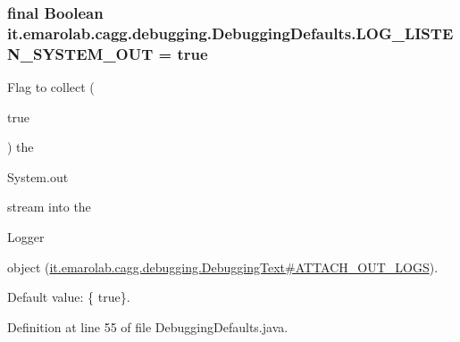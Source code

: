 \hypertarget{classit_1_1emarolab_1_1cagg_1_1debugging_1_1DebuggingDefaults_a2d4710f38eb7e92c5b733f49baefd243}{
\subsubsection[{L\-O\-G\-\_\-\-L\-I\-S\-T\-E\-N\-\_\-\-S\-Y\-S\-T\-E\-M\-\_\-\-O\-U\-T}]{\setlength{\rightskip}{0pt plus 5cm}final Boolean it.\-emarolab.\-cagg.\-debugging.\-Debugging\-Defaults.\-L\-O\-G\-\_\-\-L\-I\-S\-T\-E\-N\-\_\-\-S\-Y\-S\-T\-E\-M\-\_\-\-O\-U\-T = true\hspace{0.3cm}{\ttfamily [static]}}}\label{classit_1_1emarolab_1_1cagg_1_1debugging_1_1DebuggingDefaults_a2d4710f38eb7e92c5b733f49baefd243}
Flag to collect (
\begin{DoxyCode}
\textcolor{keyword}{true} 
\end{DoxyCode}
 ) the
\begin{DoxyCode}
System.out 
\end{DoxyCode}
 stream into the
\begin{DoxyCode}
Logger 
\end{DoxyCode}
 object (\hyperlink{}{it.\-emarolab.\-cagg.\-debugging.\-Debugging\-Text\#\-A\-T\-T\-A\-C\-H\-\_\-\-O\-U\-T\-\_\-\-L\-O\-G\-S}).\par
 Default value\-: \{ true\}. 

Definition at line 55 of file Debugging\-Defaults.\-java.

